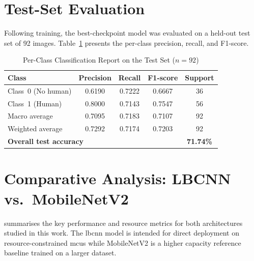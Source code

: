\section{Test-Set Evaluation}
Following training, the best-checkpoint model was evaluated on a held-out test set of 92 images. Table~\ref{tab:classification_report} presents the per-class precision, recall, and F1-score.

\begin{table}[H]
\renewcommand{\arraystretch}{1.25}
\caption{Per-Class Classification Report on the Test Set ($n = 92$)}
\label{tab:classification_report}
\centering
\begin{tabular}{lcccc}
\toprule
\textbf{Class}       & \textbf{Precision} & \textbf{Recall}
                      & \textbf{F1-score}  & \textbf{Support} \\
\midrule
Class~0 (No human)   & 0.6190 & 0.7222 & 0.6667 & 36 \\
Class~1 (Human)      & 0.8000 & 0.7143 & 0.7547 & 56 \\
\midrule
Macro average        & 0.7095 & 0.7183 & 0.7107 & 92 \\
Weighted average     & 0.7292 & 0.7174 & 0.7203 & 92 \\
\midrule
\multicolumn{4}{l}{\textbf{Overall test accuracy}} & \textbf{71.74\%} \\
\bottomrule
\end{tabular}
\end{table}



\section{Comparative Analysis: LBCNN vs.\ MobileNetV2}
 summarises the key performance and resource metrics for both architectures studied in this work. The \gls{lbcnn} model is intended for direct deployment on resource-constrained \glspl{mcu} while MobileNetV2 is a higher capacity reference baseline trained on a larger dataset.

